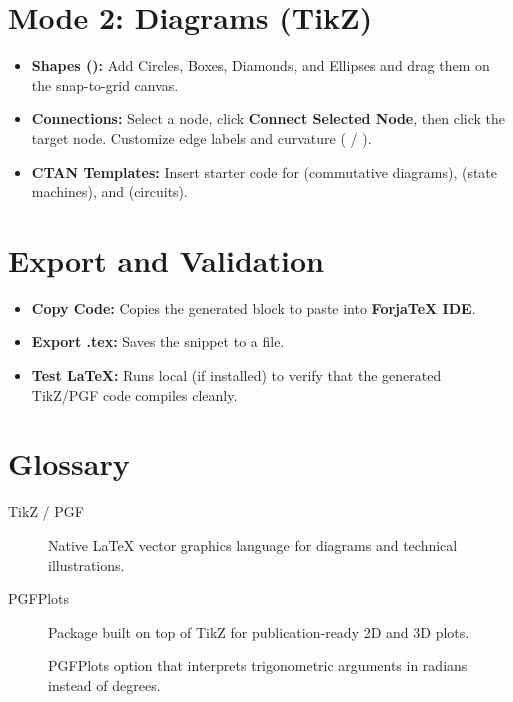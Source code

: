 \documentclass[11pt,a4paper]{article}
\begin{document}
\section{Mode 2: Diagrams (TikZ)}
\begin{itemize}
  \item \textbf{Shapes ():} Add Circles, Boxes, Diamonds, and Ellipses and drag them on the snap-to-grid canvas.
  \item \textbf{Connections:} Select a node, click \textbf{Connect Selected Node}, then click the target node. Customize edge labels and curvature ( / ).
  \item \textbf{CTAN Templates:} Insert starter code for  (commutative diagrams),  (state machines), and  (circuits).
\end{itemize}

\section{Export and Validation}
\begin{itemize}
  \item \textbf{Copy Code:} Copies the generated  block to paste into \textbf{ForjaTeX IDE}.
  \item \textbf{Export .tex:} Saves the snippet to a  file.
  \item \textbf{Test LaTeX:} Runs local  (if installed) to verify that the generated TikZ/PGF code compiles cleanly.
\end{itemize}

\section{Glossary}
\begin{description}
  \item[TikZ / PGF] Native \LaTeX{} vector graphics language for diagrams and technical illustrations.
  \item[PGFPlots] Package built on top of TikZ for publication-ready 2D and 3D plots.
  \item[] PGFPlots option that interprets trigonometric arguments in radians instead of degrees.
\end{description}
\end{document}
